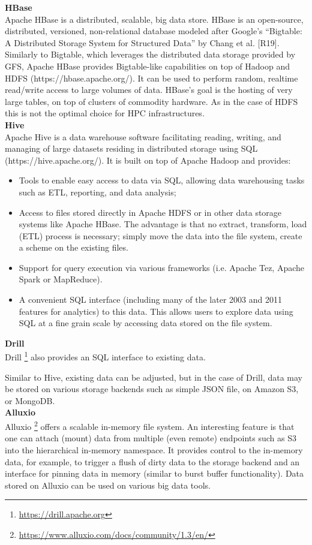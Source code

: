 \textbf{HBase}\\
Apache HBase is a distributed, scalable, big data store.
HBase is an open-source, distributed, versioned, non-relational database modeled after Google's “Bigtable: A Distributed Storage System for Structured Data” by Chang et al. [R19]. Similarly to Bigtable, which leverages the distributed data storage provided by GFS, Apache HBase provides Bigtable-like capabilities on top of Hadoop and HDFS (https://hbase.apache.org/).
It can be used to perform random, realtime read/write access to large volumes of data. HBase's goal is the hosting of very large tables, on top of clusters of commodity hardware. As in the case of HDFS this is not the optimal choice for HPC infrastructures. \\

\textbf{Hive}\\
Apache Hive is a data warehouse software facilitating reading, writing, and managing of large datasets residing in distributed storage using SQL (https://hive.apache.org/). It is built on top of Apache Hadoop and provides:
\begin{itemize}
	\item Tools to enable easy access to data via SQL, allowing data warehousing tasks such as ETL, reporting, and data analysis;
	\item Access to files stored directly in Apache HDFS or in other data storage systems like Apache HBase.
The advantage is that no extract, transform, load (ETL) process is necessary;
simply move the data into the file system, create a scheme on the existing files.
	\item Support for query execution via various frameworks (i.e. Apache Tez, Apache Spark or MapReduce).
	\item A convenient SQL interface (including many of the later 2003 and 2011 features for analytics) to this data. This allows users to explore data using SQL at a fine grain scale by accessing data stored on the file system.
\end{itemize}

\textbf{Drill}\\
Drill \footnote{\url{https://drill.apache.org}} also provides an SQL interface to existing data.

Similar to Hive, existing data can be adjusted, but in the case of Drill, data may be stored on various storage backends such as simple JSON file, on Amazon S3, or MongoDB.\\

\textbf{Alluxio}\\
Alluxio \footnote{\url{https://www.alluxio.com/docs/community/1.3/en/}} offers a scalable in-memory file system.
An interesting feature is that one can attach (mount) data from multiple (even remote) endpoints such as S3 into the hierarchical in-memory namespace.
It provides control to the in-memory data, for example, to trigger a flush of dirty data to the storage backend and an interface for pinning data in memory (similar to burst buffer functionality).
Data stored on Alluxio can be used on various big data tools.


